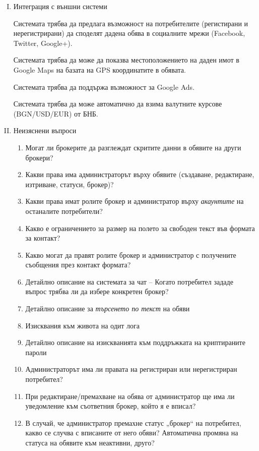 \documentclass[]{article}
\begin{document}
\begin{enumerate}[I.]
{		Допустимият downtime на системата е не повече от 48 часа общо на година.
	}
	
	\item {Интеграция с външни системи

		Системата трябва да предлага възможност на потребителите (регистирани и нерегистрирани) да споделят дадена обява в социалните мрежи (Facebook, Twitter, Google+).

		Системата трябва да може да показва местоположението на даден имот в Google Maps на базата на GPS координатите в обявата.

		Системата трябва да поддържа възможност за Google Ads.

		Системата трябва да може автоматично да взима валутните курсове (BGN/USD/EUR) от БНБ.	
	}
	
	\item {Неизяснени въпроси
		\begin{enumerate}[1.]
			\item Могат ли брокерите да разглеждат скритите данни в обявите на други брокери?
			\item Какви права има администраторът върху обявите (създаване, редактиране, изтриване, статуси, брокер)?
			\item Какви права имат ролите брокер и администратор върху \emph{акаунтите} на останалите потребители?
			\item Какво е ограничението за размер на полето за свободен текст във формата за контакт?
			\item Какво могат да правят ролите брокер и администратор с получените съобщения през контакт формата?
			\item Детайлно описание на системата за чат -- Когато потребител зададе въпрос трябва ли да избере конкретен брокер?
			\item Детайлно описание за \emph{търсенето по текст} на обяви
			\item Изисквания към живота на одит лога
			\item Детайлно описание на изискванията към поддръжката на криптираните пароли
			\item Администраторът има ли правата на регистриран или нерегистриран потребител?
			\item При редактиране/премахване на обява от администратор ще има ли уведомление към съответния брокер, който я е вписал?
			\item В случай, че администратор премахне статус „брокер“ на потребител, какво се случва с вписаните от него обяви? Автоматична промяна на статуса на обявите към неактивни, друго?

\end{enumerate}}
\end{enumerate}
\end{document}
